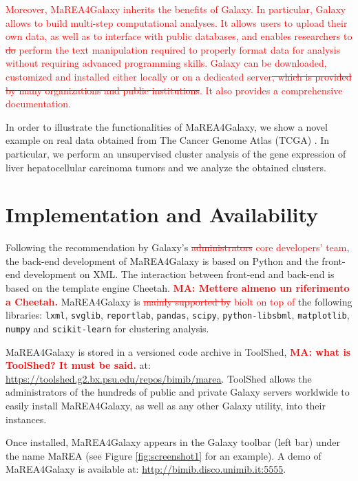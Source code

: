 \documentclass[preprint,12pt,authoryear]{elsarticle}
\newcommand{\red}{\textcolor{red}}
\newcommand{\mareagalaxy}{\textsf{MaREA4Galaxy}}
\newcommand{\mareaTool}{\textsf{MaREA}}
\begin{document}
\red{Moreover, \mareagalaxy{} inherits the benefits of Galaxy.  In
  particular, Galaxy allows to build multi-step computational
  analyses. It allows users to upload their own data, as well as to
  interface with public databases, and enables researchers to
  \sout{do} perform the text manipulation required to properly format
  data for analysis without requiring advanced programming skills.
  Galaxy can be downloaded, customized and installed either locally or
  on a dedicated server\sout{, which is provided by many organizations and
  public institutions}. It also provides a comprehensive
  documentation.}

In order to illustrate the functionalities of \mareagalaxy{}, we show a
novel example on real data obtained from The Cancer Genome Atlas
(TCGA) \citep{TCGA}. In particular, we perform an unsupervised cluster
analysis of the gene expression of liver hepatocellular carcinoma
tumors and we analyze the obtained clusters.


\section{Implementation and Availability}

Following the recommendation by Galaxy's \red{\sout{administrators}
  core developers' team}, the back-end
development of \mareagalaxy{} is based on Python and the front-end
development on XML. The interaction between front-end and back-end is
based on the template engine Cheetah. \red{\bfseries MA: Mettere
  almeno un riferimento a Cheetah.}
%
\mareagalaxy{} is \red{\sout{mainly supported by} biolt on top of} the
following libraries: \texttt{lxml}, \texttt{svglib},
\texttt{reportlab}, \texttt{pandas}, \texttt{scipy},
\texttt{python-libsbml}, \texttt{matplotlib}, \texttt{numpy} and
\texttt{scikit-learn} for clustering analysis.

\mareagalaxy{} is stored in a versioned code archive in ToolShed,
\red{\bfseries MA: what is ToolShed?  It must be said.} at:\\
\url{https://toolshed.g2.bx.psu.edu/repos/bimib/marea}.  ToolShed
allows the administrators of the hundreds of public and private Galaxy
servers worldwide to easily install \mareagalaxy, as well as any other
Galaxy utility, into their instances.

Once installed, \mareagalaxy{} appears in the Galaxy toolbar (left bar)
under the name \mareaTool{} (see Figure \ref{fig:screenshot1} for an
example).  A demo of \mareagalaxy{} is available at:
\url{http://bimib.disco.unimib.it:5555}.
\end{document}
